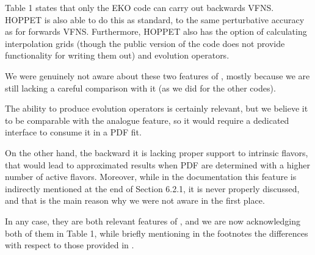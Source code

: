 \documentclass[a4paper,11pt]{article}
\begin{document}
\begin{response}{
  Table 1 states that only the EKO code can carry out backwards VFNS. HOPPET is
  also able to do this as standard, to the same perturbative accuracy as for
  forwards VFNS.  Furthermore, HOPPET also has the option of calculating
  interpolation grids (though the public version of the code does not provide
  functionality for writing them out) and evolution operators.
}

We were genuinely not aware about these two features of \hoppet{}, mostly
because we are still lacking a careful comparison with it (as we did for the
other codes).

The ability to produce evolution operators is certainly relevant, but we
believe it to be comparable with the analogue \apfel{} feature, so it would
require a dedicated interface to consume it in a PDF fit.

On the other hand, the backward \vfns{} it is lacking proper support to
intrinsic flavors, that would lead to approximated results when PDF are
determined with a higher number of active flavors.
Moreover, while in the documentation this feature is indirectly mentioned at
the end of Section 6.2.1, it is never properly discussed, and that is the
main reason why we were not aware in the first place.

In any case, they are both relevant features of \hoppet{}, and we are now
acknowledging both of them in Table 1, while briefly mentioning in the
footnotes the differences with respect to those provided in \eko{}.
\end{response}

% 
% 

\end{document}
